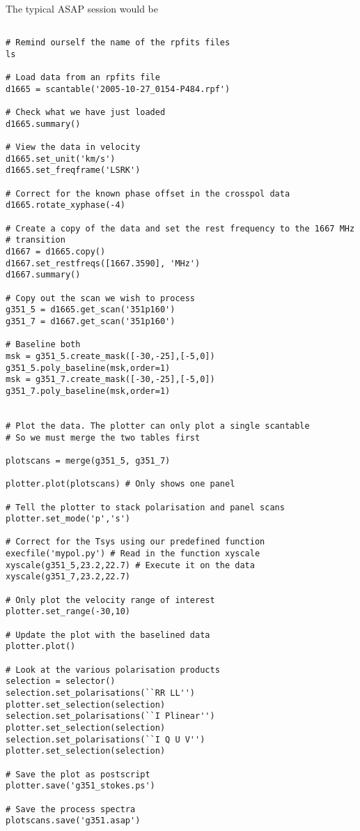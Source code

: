 \documentclass[11pt]{article}
\begin{document}
The typical ASAP session would be

\begin{verbatim}

# Remind ourself the name of the rpfits files
ls

# Load data from an rpfits file
d1665 = scantable('2005-10-27_0154-P484.rpf')

# Check what we have just loaded
d1665.summary()

# View the data in velocity
d1665.set_unit('km/s')
d1665.set_freqframe('LSRK')

# Correct for the known phase offset in the crosspol data
d1665.rotate_xyphase(-4)

# Create a copy of the data and set the rest frequency to the 1667 MHz
# transition
d1667 = d1665.copy()
d1667.set_restfreqs([1667.3590], 'MHz')
d1667.summary()

# Copy out the scan we wish to process
g351_5 = d1665.get_scan('351p160')
g351_7 = d1667.get_scan('351p160')

# Baseline both
msk = g351_5.create_mask([-30,-25],[-5,0])
g351_5.poly_baseline(msk,order=1)
msk = g351_7.create_mask([-30,-25],[-5,0])
g351_7.poly_baseline(msk,order=1)


# Plot the data. The plotter can only plot a single scantable
# So we must merge the two tables first

plotscans = merge(g351_5, g351_7)

plotter.plot(plotscans) # Only shows one panel

# Tell the plotter to stack polarisation and panel scans
plotter.set_mode('p','s')

# Correct for the Tsys using our predefined function
execfile('mypol.py') # Read in the function xyscale
xyscale(g351_5,23.2,22.7) # Execute it on the data
xyscale(g351_7,23.2,22.7)

# Only plot the velocity range of interest
plotter.set_range(-30,10)

# Update the plot with the baselined data
plotter.plot()

# Look at the various polarisation products
selection = selector()
selection.set_polarisations(``RR LL'')
plotter.set_selection(selection)
selection.set_polarisations(``I Plinear'')
plotter.set_selection(selection)
selection.set_polarisations(``I Q U V'')
plotter.set_selection(selection)

# Save the plot as postscript
plotter.save('g351_stokes.ps')

# Save the process spectra
plotscans.save('g351.asap')

\end{verbatim}
\end{document}
